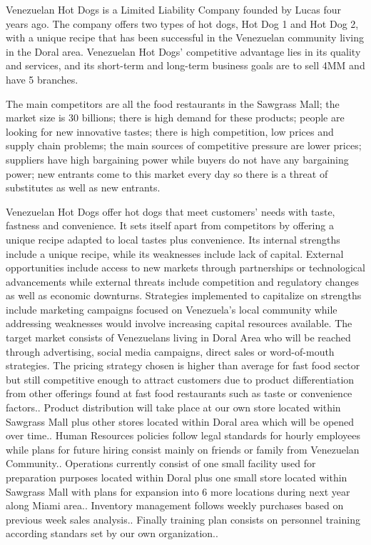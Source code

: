 

Venezuelan Hot Dogs is a Limited Liability Company founded by Lucas four years ago. The company offers two types of hot dogs, Hot Dog 1 and Hot Dog 2, with a unique recipe that has been successful in the Venezuelan community living in the Doral area. Venezuelan Hot Dogs' competitive advantage lies in its quality and services, and its short-term and long-term business goals are to sell 4MM and have 5 branches. 

The main competitors are all the food restaurants in the Sawgrass Mall; the market size is 30 billions; there is high demand for these products; people are looking for new innovative tastes; there is high competition, low prices and supply chain problems; the main sources of competitive pressure are lower prices; suppliers have high bargaining power while buyers do not have any bargaining power; new entrants come to this market every day so there is a threat of substitutes as well as new entrants. 

Venezuelan Hot Dogs offer hot dogs that meet customers' needs with taste, fastness and convenience. It sets itself apart from competitors by offering a unique recipe adapted to local tastes plus convenience. Its internal strengths include a unique recipe, while its weaknesses include lack of capital. External opportunities include access to new markets through partnerships or technological advancements while external threats include competition and regulatory changes as well as economic downturns. Strategies implemented to capitalize on strengths include marketing campaigns focused on Venezuela's local community while addressing weaknesses would involve increasing capital resources available. The target market consists of Venezuelans living in Doral Area who will be reached through advertising, social media campaigns, direct sales or word-of-mouth strategies. The pricing strategy chosen is higher than average for fast food sector but still competitive enough to attract customers due to product differentiation from other offerings found at fast food restaurants such as taste or convenience factors.. Product distribution will take place at our own store located within Sawgrass Mall plus other stores located within Doral area which will be opened over time.. Human Resources policies follow legal standards for hourly employees while plans for future hiring consist mainly on friends or family from Venezuelan Community.. Operations currently consist of one small facility used for preparation purposes located within Doral plus one small store located within Sawgrass Mall with plans for expansion into 6 more locations during next year along Miami area.. Inventory management follows weekly purchases based on previous week sales analysis.. Finally training plan consists on personnel training according standars set by our own organization.. 

